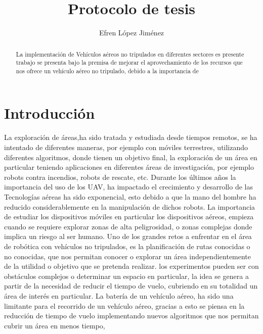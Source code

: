 \documentclass[]{report}
\title{Protocolo de tesis}
\author{Efren López Jiménez}
\begin{document}
	

	

\newpage\null\thispagestyle{empty}\newpage
	

\begin{abstract}
	
La implementación de Vehículos aéreos no tripulados en diferentes sectores es  presente trabajo se presenta bajo la premisa de mejorar el aprovechamiento de los recursos que nos ofrece un vehículo aéreo no tripulado, debido a la importancia de  
\end{abstract}

\tableofcontents

\chapter{Introducción}
La exploración de áreas,ha sido tratada y estudiada desde tiempos remotos, se ha intentado de diferentes maneras, por ejemplo con móviles terrestres, utilizando diferentes algoritmos, donde tienen un objetivo final, la exploración de un área en particular teniendo aplicaciones en diferentes áreas de investigación, por ejemplo robots contra incendios, robots de rescate, etc.
Durante los últimos años la importancia del uso de los UAV, ha impactado  el crecimiento y desarrollo de las Tecnologías aéreas ha sido exponencial, esto debido a que la mano del hombre ha reducido considerablemente en la manipulación de dichos robots.
La importancia de estudiar los dispositivos móviles en particular los dispositivos aéreos, empieza cuando se requiere explorar zonas de alta peligrosidad, o zonas complejas donde implica un riesgo al ser humano.
Uno de los grandes retos a enfrentar en el área de robótica con vehículos no tripulados, es la planificación de rutas conocidas o no conocidas, que nos permitan conocer o explorar un área independientemente de la utilidad o objetivo que se pretenda realizar. los experimentos pueden ser con obstáculos complejos o determinar un espacio en particular, la idea se genera a partir de la necesidad de reducir el tiempo de vuelo, cubriendo en su totalidad un área de interés en particular.
La batería de un vehículo aéreo, ha sido una limitante para el recorrido de un vehículo aéreo, gracias a esto se piensa en la reducción de tiempo de vuelo implementando nuevos algoritmos que nos permitan cubrir un área en menos tiempo, 
\end{document}
